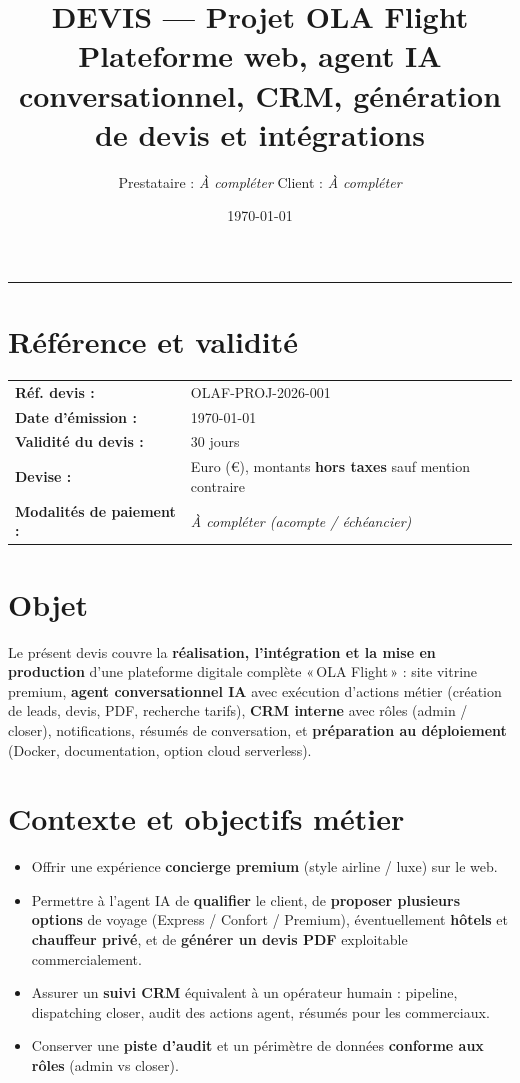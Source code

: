 \documentclass[11pt,a4paper]{article}
\title{\Large\textbf{DEVIS — Projet OLA Flight}\\[0.4em]
\large Plateforme web, agent IA conversationnel, CRM, génération de devis et intégrations}
\author{Prestataire : \textit{À compléter} \quad Client : \textit{À compléter}}
\date{\today}
\begin{document}
\maketitle

\vspace{-0.5em}
\noindent\rule{\textwidth}{0.4pt}

\section*{Référence et validité}
\begin{tabular}{@{}ll@{}}
\textbf{Réf. devis :} & OLAF-PROJ-2026-001 \\
\textbf{Date d'émission :} & \today \\
\textbf{Validité du devis :} & 30 jours \\
\textbf{Devise :} & Euro (€), montants \textbf{hors taxes} sauf mention contraire \\
\textbf{Modalités de paiement :} & \textit{À compléter (acompte / échéancier)} \\
\end{tabular}

\section{Objet}
Le présent devis couvre la \textbf{réalisation, l'intégration et la mise en production} d'une plateforme digitale complète «\,OLA Flight\,» : site vitrine premium, \textbf{agent conversationnel IA} avec exécution d'actions métier (création de leads, devis, PDF, recherche tarifs), \textbf{CRM interne} avec rôles (admin / closer), notifications, résumés de conversation, et \textbf{préparation au déploiement} (Docker, documentation, option cloud serverless).

\section{Contexte et objectifs métier}
\begin{itemize}[leftmargin=*]
  \item Offrir une expérience \textbf{concierge premium} (style airline / luxe) sur le web.
  \item Permettre à l'agent IA de \textbf{qualifier} le client, de \textbf{proposer plusieurs options} de voyage (Express / Confort / Premium), éventuellement \textbf{hôtels} et \textbf{chauffeur privé}, et de \textbf{générer un devis PDF} exploitable commercialement.
  \item Assurer un \textbf{suivi CRM} équivalent à un opérateur humain : pipeline, dispatching closer, audit des actions agent, résumés pour les commerciaux.
  \item Conserver une \textbf{piste d'audit} et un périmètre de données \textbf{conforme aux rôles} (admin vs closer).
\end{itemize}
\end{document}
